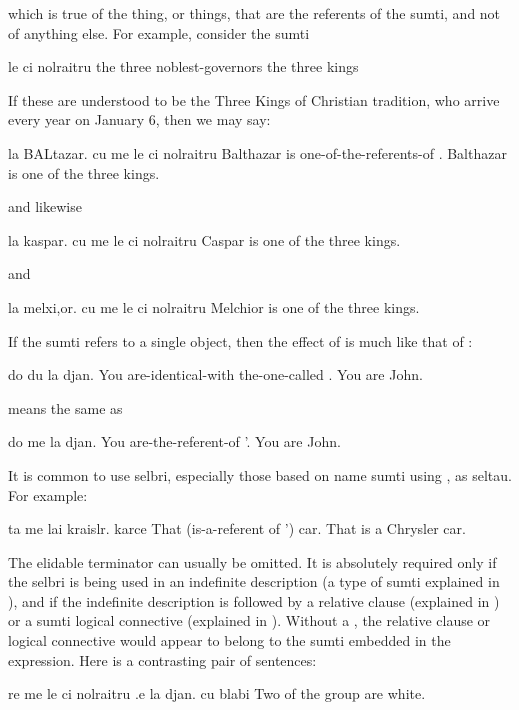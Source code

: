 which is true of the thing, or things, that are the referents
    of the sumti, and not of anything else. For example, consider
    the sumti
\begin{example}
le ci nolraitru\n
the three noblest-governors\n
the three kings
\end{example}

If these are understood to be the Three Kings of Christian
    tradition, who arrive every year on January 6, then we may say:
\begin{example}
la BALtazar. cu me le ci nolraitru\n
Balthazar is one-of-the-referents-of .\n
Balthazar is one of the three kings.
\end{example}

{\noindent}and likewise
\begin{example}
la kaspar. cu me le ci nolraitru\n
Caspar is one of the three kings.
\end{example}

{\noindent}and
\begin{example}
la melxi,or. cu me le ci nolraitru\n
Melchior is one of the three kings.
\end{example}

If the sumti refers to a single object, then the effect of
     is much like that of :
\begin{example}
do du la djan.\n
You are-identical-with the-one-called .\n
You are John.
\end{example}

{\noindent}means the same as
\begin{example}
do me la djan.\n
You are-the-referent-of '.\n
You are John.
\end{example}

It is common to use  selbri, especially those based on
    name sumti using , as seltau. For example:
\begin{example}
ta me lai kraislr.  karce\n
That (is-a-referent of ') car.\n
That is a Chrysler car.
\end{example}

The elidable terminator  can usually be omitted. It is
    absolutely required only if the  selbri is being used in
    an indefinite description (a type of sumti explained in ), and if the indefinite
    description is followed by a relative clause (explained in ) or a sumti logical connective
    (explained in ). Without a
    , the relative clause or logical connective would
    appear to belong to the sumti embedded in the 
    expression. Here is a contrasting pair of sentences:
\begin{example}
re me le ci nolraitru .e la djan.  cu blabi\n
Two of the group  are white.
\end{example}

